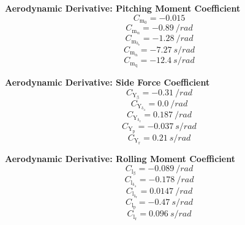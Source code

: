 \documentclass[lettersize,journal]{IEEEtran}
\begin{document}
{\vfill\null
\textbf{Aerodynamic Derivative: Pitching Moment Coefficient}
\begin{equation}
C_{\mathrm{m}_{\mathrm{0}}} = -0.015
\end{equation}
\begin{equation}
C_{\mathrm{m}_{\mathrm{\alpha}}} = -0.89\ /rad
\end{equation}
\begin{equation}
C_{\mathrm{m}_{\mathrm{\delta_{\mathrm{e}}}}} = -1.28\ /rad
\end{equation}
\begin{equation}
C_{\mathrm{m}_{\mathrm{\dot{\alpha}}}} = -7.27\ s/rad
\end{equation}
\begin{equation}
C_{\mathrm{m}_{\mathrm{q}}} = -12.4\ s/rad
\end{equation}

\vfill\null
\textbf{Aerodynamic Derivative: Side Force Coefficient}
\begin{equation}
C_{\mathrm{Y}_{\mathrm{\beta}}} = -0.31\ /rad
\end{equation}
\begin{equation}
C_{\mathrm{Y}_{\mathrm{\delta_{\mathrm{a}}}}} = 0.0\ /rad
\end{equation}
\begin{equation}
C_{\mathrm{Y}_{\mathrm{\delta_{\mathrm{r}}}}} = 0.187\ /rad
\end{equation}
\begin{equation}
C_{\mathrm{Y}_{\mathrm{p}}} = -0.037\ s/rad
\end{equation}
\begin{equation}
C_{\mathrm{Y}_{\mathrm{r}}} = 0.21\ s/rad
\end{equation}

\vfill\null
\textbf{Aerodynamic Derivative: Rolling Moment Coefficient}
\begin{equation}
C_{\mathrm{l}_{\mathrm{\beta}}} = -0.089\ /rad
\end{equation}
\begin{equation}
C_{\mathrm{l}_{\mathrm{\delta_{\mathrm{a}}}}} = -0.178\ /rad
\end{equation}
\begin{equation}
C_{\mathrm{l}_{\mathrm{\delta_{\mathrm{r}}}}} = 0.0147\ /rad
\end{equation}
\begin{equation}
C_{\mathrm{l}_{\mathrm{p}}} = -0.47\ s/rad
\end{equation}
\begin{equation}
C_{\mathrm{l}_{\mathrm{r}}} = 0.096\ s/rad
\end{equation}

}
\end{document}
